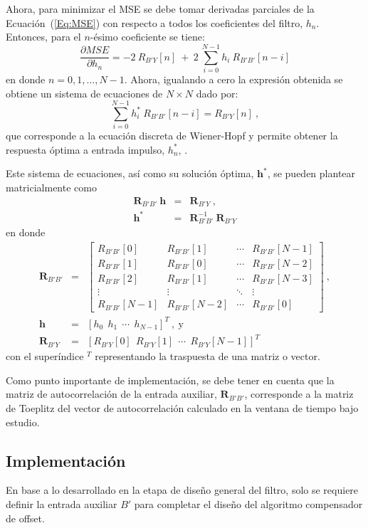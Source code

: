 Ahora, para minimizar el MSE se debe tomar derivadas parciales de la Ecuación~(\ref{Eq:MSE}) con respecto a todos los coeficientes del filtro, $h_n$. Entonces, para el $n$-ésimo coeficiente se tiene:
\begin{equation}
 \frac{\partial MSE}{\partial h_n} = -2~R_{B'Y}[n] ~+~ 2~\sum_{i=0}^{N-1} h_i~R_{B'B'}[n-i]
\end{equation}
en donde $n=0,1,\ldots,N-1$. Ahora, igualando a cero la expresión obtenida se obtiene un sistema de ecuaciones de $N\times N$ dado por:
$$ \sum_{i=0}^{N-1} h_i^*~R_{B'B'}[n-i] = R_{B'Y}[n]~,$$
que corresponde a la ecuación discreta de Wiener-Hopf y permite obtener la respuesta óptima a entrada impulso, $h_n^*$, \cite{gustafsson}.

Este sistema de ecuaciones, así como su solución óptima, $\bm h^*$, se pueden plantear matricialmente como
\begin{eqnarray}
 \bm R_{B'B'} ~\bm h &=& \bm R_{B'Y}~,\\
 \bm h^* &=& \bm R_{B'B'}^{-1}~\bm R_{B'Y}
\label{Eq:LinearSystem}
\end{eqnarray}
en donde 
\begin{eqnarray}
 \bm R_{B'B'} &=& \left[\begin{array}{cccc}
    R_{B'B'}[0] & R_{B'B'}[1] & \cdots & R_{B'B'}[N-1]\\
    R_{B'B'}[1] & R_{B'B'}[0] & \cdots & R_{B'B'}[N-2]\\
    R_{B'B'}[2] & R_{B'B'}[1] & \cdots & R_{B'B'}[N-3]\\
    \vdots	& \vdots      & \ddots & \vdots\\
    R_{B'B'}[N-1] & R_{B'B'}[N-2] &\cdots & R_{B'B'}[0]
  \end{array}\right]~,\\
%
 \bm h &=& \left[h_0~~h_1~~\cdots~~h_{N-1}\right]^T~,~\mbox{y}\\
%
 \bm R_{B'Y} &=&\left[R_{B'Y}[0]~~R_{B'Y}[1]~~\cdots~~R_{B'Y}[N-1]\right]^T
\end{eqnarray}
con el superíndice $^T$ representando la traspuesta de una matriz o vector.

Como punto importante de implementación, se debe tener en cuenta que la matriz de autocorrelación de la entrada auxiliar, $\bm R_{B'B'}$, corresponde a la matriz de Toeplitz del vector de autocorrelación calculado en la ventana de tiempo bajo estudio.

\subsection{Implementación}
En base a lo desarrollado en la etapa de diseño general del filtro, solo se requiere definir la entrada auxiliar $B'$ para completar el diseño del algoritmo compensador de offset.

